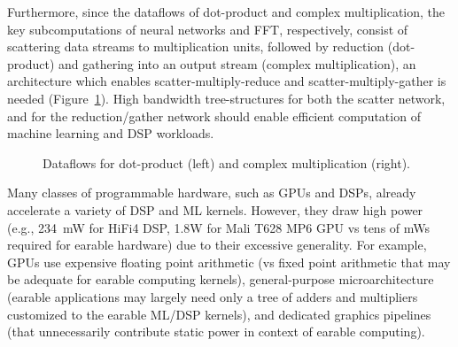 Furthermore, since the dataflows of dot-product and complex multiplication, the key subcomputations of neural networks and FFT, respectively, consist of scattering
data streams to multiplication units, followed by reduction (dot-product) and gathering into an output stream (complex multiplication), an architecture which enables scatter-multiply-reduce and scatter-multiply-gather is needed
(Figure~\ref{fig:complex-vs-dot}).
High bandwidth tree-structures for both the scatter network, and for the reduction/gather network should enable efficient computation of machine learning and DSP workloads.

\begin{figure}[htbp]
 \centering
   \caption{
   \small
   Dataflows for dot-product (left) and complex multiplication (right).
 }
 \label{fig:complex-vs-dot}
\end{figure}




Many classes of programmable hardware, such as GPUs and DSPs, already
accelerate a variety of DSP and ML kernels. However, they draw high power
(e.g., \SI{234}{\milli\watt} for HiFi4 DSP, 1.8W for Mali T628 MP6 GPU vs tens
of \si{\milli\watt}s required for earable hardware) due to their excessive
generality. 
For example, GPUs use expensive floating point
arithmetic (vs fixed point arithmetic that may be adequate for earable
computing kernels), general-purpose microarchitecture (earable applications may largely need only a tree of adders and multipliers customized to the earable ML/DSP kernels), and
dedicated graphics pipelines (that unnecessarily contribute static power in
context of earable computing). 

